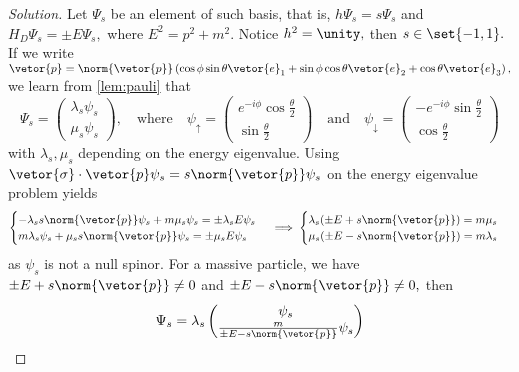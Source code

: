 \begin{proof}[Solution]
   Let \(\Psi_s\) be an element of such basis, that is, \(h \Psi_s = s \Psi_s\) and \(H_D \Psi_s = \pm E \Psi_s,\) where \(E^2 = p^2 + m^2.\) Notice \(h^2 = \unity,\) then \(s \in \set{-1,1}.\) If we write \(\vetor{p} = \norm{\vetor{p}} \left(\cos\phi \sin\theta \vetor{e}_1 + \sin\phi\cos\theta \vetor{e}_2 + \cos\theta \vetor{e}_3\right),\) we learn from \cref{lem:pauli} that
   \begin{equation*}
      \Psi_s = \begin{pmatrix}
         \lambda_s \psi_s\\
         \mu_s \psi_s
      \end{pmatrix},
      \quad\text{where}\quad
      \psi_{\uparrow} = \begin{pmatrix}
         e^{-i\phi}\cos\frac\theta2\\
         \sin\frac\theta2
      \end{pmatrix}
      \quad\text{and}\quad
      \psi_\downarrow = \begin{pmatrix}
         -e^{-i\phi}\sin\frac\theta2\\
         \cos\frac\theta2
      \end{pmatrix}
   \end{equation*}
   with \(\lambda_s, \mu_s\) depending on the energy eigenvalue. Using \(\vetor{\sigma} \cdot \vetor{p}\psi_s = s\norm{\vetor{p}} \psi_s\) on the energy eigenvalue problem yields
   \begin{equation*}
      \begin{cases}
         -\lambda_s s \norm{\vetor{p}} \psi_s + m \mu_s \psi_s = \pm\lambda_s E \psi_s\\
         m \lambda_s  \psi_s  + \mu_s s  \norm{\vetor{p}} \psi_s =  \pm\mu_s E \psi_s
      \end{cases}
      \implies
      \begin{cases}
         \lambda_s (\pm E + s \norm{\vetor{p}}) = m \mu_s\\
         \mu_s (\pm E - s \norm{\vetor{p}}) = m \lambda_s
      \end{cases}
   \end{equation*}
   as \(\psi_s\) is not a null spinor. For a massive particle, we have \(\pm E + s \norm{\vetor{p}} \neq 0\) and \(\pm E - s \norm{\vetor{p}} \neq 0,\) then
   \begin{equation*}
      \Psi_s = \lambda_s
      \begin{pmatrix}
         \psi_s\\
         \frac{m}{\pm E - s\norm{\vetor{p}}} \psi_s

\end{pmatrix}
\end{equation*}
\end{proof}
